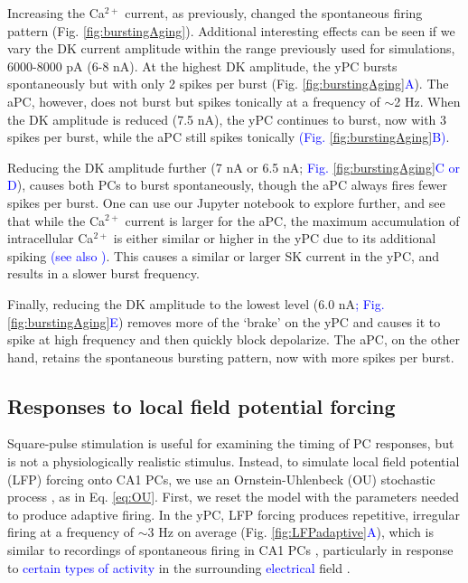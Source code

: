 \documentclass[10pt,letterpaper]{article}
\newcommand{\Ca}{Ca$^{2+}$}
\newcommand{\edit}[1]{\textcolor{blue}{#1}}
\begin{document}
Increasing the {\Ca} current, as previously, changed the spontaneous firing pattern (Fig. \ref{fig:burstingAging}). Additional interesting effects can be seen if we vary the DK current amplitude within the range previously used for simulations, 6000-8000 pA (6-8 nA). At the highest DK amplitude, the yPC bursts spontaneously but with only 2 spikes per burst (Fig. \ref{fig:burstingAging}\edit{A}). The aPC, however, does not burst but spikes tonically at a frequency of $\sim$2 Hz. When the DK amplitude is reduced (7.5 nA), the yPC continues to burst, now with 3 spikes per burst, while the aPC still spikes tonically \edit{(Fig. \ref{fig:burstingAging}B)}. 

Reducing the DK amplitude further (7 nA or 6.5 nA; \edit{Fig. \ref{fig:burstingAging}C or D}), causes both PCs to burst spontaneously, though the aPC always fires fewer spikes per burst. One can use our Jupyter notebook to explore further, and see that while the {\Ca} current is larger for the aPC, the maximum accumulation of intracellular {\Ca} is either similar or higher in the yPC due to its additional spiking \edit{(see also )}. This causes a similar or larger SK current in the yPC, and results in a slower burst frequency.

Finally, reducing the DK amplitude to the lowest level (6.0 nA\edit{; Fig. \ref{fig:burstingAging}E}) removes more of the `brake' on the yPC and causes it to spike at high frequency and then quickly block depolarize. The aPC, on the other hand, retains the spontaneous bursting pattern, now with more spikes per burst.

\subsection*{Responses to local field potential forcing}
Square-pulse stimulation is useful for examining the timing of PC responses, but is not a physiologically realistic stimulus. Instead, to simulate local field potential (LFP) forcing onto CA1 PCs, we use an Ornstein-Uhlenbeck \edit{}(OU) stochastic process \cite{rudolph2004method,destexhe2004novel}, as in Eq. \ref{eq:OU}. First, we reset the model with the parameters needed to produce adaptive firing. In the yPC, LFP forcing produces repetitive, irregular firing at a frequency of $\sim$3 Hz on average (Fig. \ref{fig:LFPadaptive}\edit{A}), which is similar to recordings of spontaneous firing in CA1 PCs \cite{manseau2017tuning}, particularly in response to \edit{certain types of activity} in the surrounding \edit{electrical} field \cite{bland2005heterogeneity,huh2016excitatory}.
\end{document}
